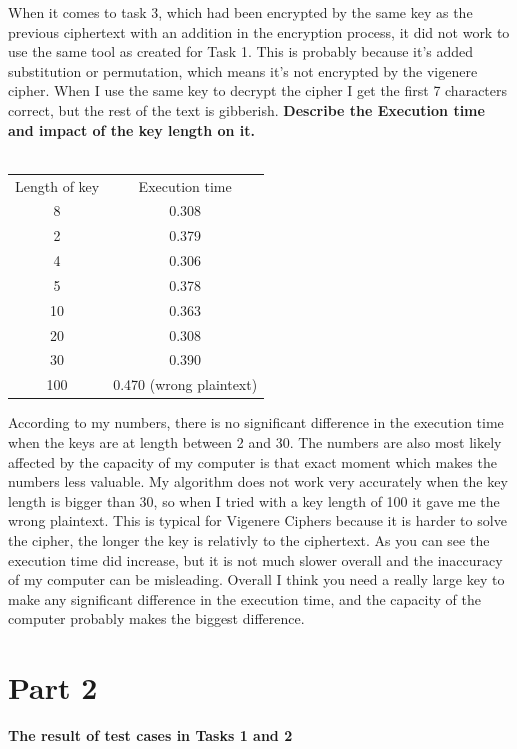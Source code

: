 \documentclass[12pt, letterpaper]{article}
\begin{document}
When it comes to task 3, which had been encrypted by the same key as the previous ciphertext with an addition in the encryption process, it did not work to use the same tool as created for Task 1. This is probably because it's added substitution or permutation, which means it's not encrypted by the vigenere cipher. When I use the same key to decrypt the cipher I get the first 7 characters correct, but the rest of the text is gibberish.
\newpage 
\textbf{Describe the Execution time and impact of the key length on it.}
\\ \\
\begin{center}
\begin{tabular}{ |c|c| } 
 \hline
 Length of key & Execution time \\
 8 & 0.308 \\ 
 2 & 0.379 \\
 4 & 0.306 \\
 5 & 0.378 \\
 10 & 0.363 \\
 20 & 0.308 \\
 30 & 0.390 \\
 100 & 0.470 (wrong plaintext) \\
 \hline
\end{tabular}
\end{center}

According to my numbers, there is no significant difference in the execution time when the keys are at length between 2 and 30. The numbers are also most likely affected by the capacity of my computer is that exact moment which makes the numbers less valuable. My algorithm does not work very accurately when the key length is bigger than 30, so when I tried with a key length of 100 it gave me the wrong plaintext. This is typical for Vigenere Ciphers because it is harder to solve the cipher, the longer the key is relativly to the ciphertext. As you can see the execution time did increase, but it is not much slower overall and the inaccuracy of my computer can be misleading. Overall I think you need a really large key to make any significant difference in the execution time, and the capacity of the computer probably makes the biggest difference.
\newpage
\section*{Part 2}
\textbf{The result of test cases in Tasks 1 and 2}
\end{document}
